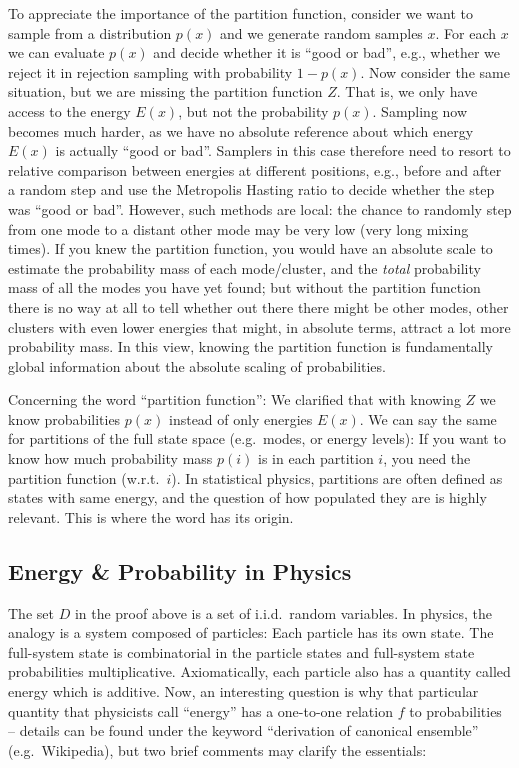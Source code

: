 To appreciate the importance of the partition function, consider we want
to sample from a distribution $p(x)$ and we generate random samples
$x$. For each $x$ we can evaluate $p(x)$ and decide whether it is
``good or bad'', e.g., whether we reject it in rejection sampling with
probability $1-p(x)$. Now consider the same situation, but we are
missing the partition function $Z$. That is, we only have access to
the energy $E(x)$, but not the probability $p(x)$. Sampling now
becomes much harder, as we have no absolute reference about which energy
$E(x)$ is actually ``good or bad''. Samplers in this case therefore
need to resort to relative comparison between energies at different
positions, e.g., before and after a random step and use the Metropolis
Hasting ratio to decide whether the step was ``good or bad''. However,
such methods are local: the chance to randomly step from one
mode to a distant other mode may be very low (very long mixing
times). If you knew the partition function, you would have an absolute
scale to estimate the probability mass of each mode/cluster, and
the \emph{total} probability mass of all the modes you have yet found;
but without the partition function there is no way at all to tell
whether out there there might be other modes, other clusters with even
lower energies that might, in absolute terms, attract a lot more
probability mass. In this view, knowing the partition function is
fundamentally global information about the absolute scaling of
probabilities.

Concerning the word ``partition function'': We clarified that with knowing $Z$ we know probabilities $p(x)$ instead of only energies $E(x)$. We can say the same for partitions of the full state space (e.g.\ modes, or energy levels): If you want to know how much probability mass $p(i)$ is in each partition $i$, you need the partition function (w.r.t.\ $i$). In statistical physics, partitions are often defined as states with same energy, and the question of how populated they are is highly relevant. This is where the word has its origin.


\subsection{Energy \& Probability in Physics}


The set $D$ in the proof above is a set of i.i.d.\ random
variables. In physics, the analogy is a system composed of particles:
Each particle has its own state. The full-system state is
combinatorial in the particle states and full-system state
probabilities multiplicative. Axiomatically, each particle also has a
quantity called energy which is additive. Now, an interesting question
is why that particular quantity that physicists call ``energy'' has a
one-to-one relation $f$ to probabilities -- details can be found under
the keyword ``derivation of canonical ensemble'' (e.g.\ Wikipedia),
but two brief comments may clarify the essentials:

